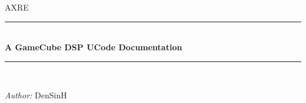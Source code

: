 
\begin{titlepage}

    \newcommand{\HRule}{\rule{\linewidth}{0.1mm}} %
    
    \center %
     
    
    \textsc{\LARGE AXRE}\\[1.5cm] %
    
    
    \HRule \\[0.4cm]
    { \huge \bfseries A GameCube DSP UCode Documentation}\\[0.4cm] %
    \HRule \\[1.5cm]
     
    
    \begin{minipage}{\textwidth}
    \begin{center} \large
    \emph{Author:} DenSinH
    \end{center}
    \end{minipage}\\[2cm]
        

    

\end{titlepage}
